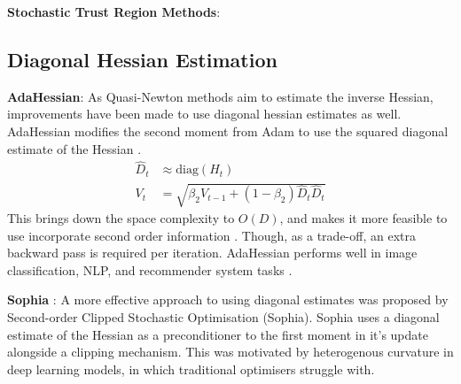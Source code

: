 \textbf{Stochastic Trust Region Methods}: 

\subsection{Diagonal Hessian Estimation} \label{sec:diag_hessian}
\textbf{AdaHessian}: As Quasi-Newton methods aim to estimate the inverse Hessian, improvements have been made to use diagonal hessian estimates as well. AdaHessian modifies the second moment from Adam to use the squared diagonal estimate of the Hessian \citep{yao2021adahessianadaptivesecondorder}.
\begin{align}
    \hat{D}_t &\approx \text{diag}(H_t) \\
    V_t &= \sqrt{\beta_2 V_{t-1} + (1 - \beta_2) \hat{D}_t\hat{D}_t}
\end{align}
This brings down the space complexity to $O(D)$, and makes it more feasible to use incorporate second order information \citep{yao2021adahessianadaptivesecondorder}. Though, as a trade-off, an extra backward pass is required per iteration. AdaHessian performs well in image classification, NLP, and recommender system tasks \citep{yao2021adahessianadaptivesecondorder}.

\textbf{Sophia} : A more effective approach to using diagonal estimates was proposed by Second-order Clipped Stochastic Optimisation (Sophia). Sophia uses a diagonal estimate of the Hessian as a preconditioner to the first moment in it's update alongside a clipping mechanism. This was motivated by heterogenous curvature in deep learning models, in which traditional optimisers struggle with. 

